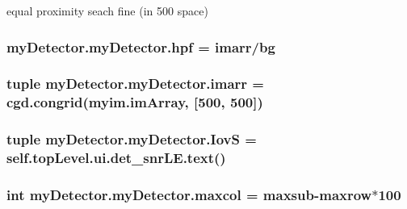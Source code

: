 equal proximity seach fine (in 500 space) \hypertarget{classmy_detector_1_1my_detector_a8d151e9e0479b3bed1067c7f3bcf35e0}{
\subsubsection[{hpf}]{\setlength{\rightskip}{0pt plus 5cm}my\-Detector.\-my\-Detector.\-hpf = {\bf imarr}/{\bf bg}\hspace{0.3cm}{\ttfamily [static]}}}\label{classmy_detector_1_1my_detector_a8d151e9e0479b3bed1067c7f3bcf35e0}
\hypertarget{classmy_detector_1_1my_detector_a410f74814a76fe6a1def53b340335fa7}{
\subsubsection[{imarr}]{\setlength{\rightskip}{0pt plus 5cm}tuple my\-Detector.\-my\-Detector.\-imarr = cgd.\-congrid(myim.\-im\-Array, \mbox{[}500, 500\mbox{]})\hspace{0.3cm}{\ttfamily [static]}}}\label{classmy_detector_1_1my_detector_a410f74814a76fe6a1def53b340335fa7}
\hypertarget{classmy_detector_1_1my_detector_a47317ecbf510f2824ec6cde297d1b49e}{
\subsubsection[{Iov\-S}]{\setlength{\rightskip}{0pt plus 5cm}tuple my\-Detector.\-my\-Detector.\-Iov\-S = self.\-top\-Level.\-ui.\-det\-\_\-snr\-L\-E.\-text()\hspace{0.3cm}{\ttfamily [static]}}}\label{classmy_detector_1_1my_detector_a47317ecbf510f2824ec6cde297d1b49e}
\hypertarget{classmy_detector_1_1my_detector_afc1018938cfcc881d1bf17950b2dece6}{
\subsubsection[{maxcol}]{\setlength{\rightskip}{0pt plus 5cm}int my\-Detector.\-my\-Detector.\-maxcol = {\bf maxsub}-\/{\bf maxrow}$\ast$100\hspace{0.3cm}{\ttfamily [static]}}}\label{classmy_detector_1_1my_detector_afc1018938cfcc881d1bf17950b2dece6}
